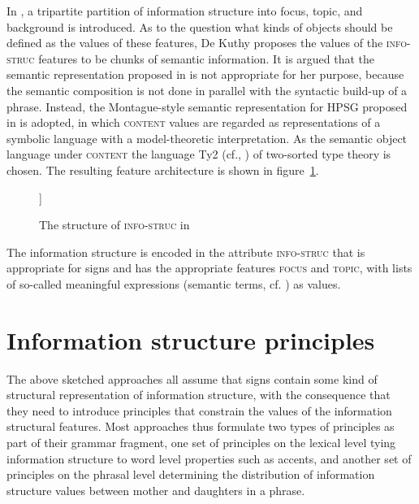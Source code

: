 \documentclass[output=paper]{langsci/langscibook}
\begin{document}
In \cite{deKuthy2002a}, a tripartite partition of information
structure into focus, topic, and background is introduced. As to the
question what kinds of objects should be defined as the values of
these features, De Kuthy proposes the values of the
\textsc{info-struc} features to be chunks of semantic information.  It
is argued that the semantic representation proposed in \cite{ps2} is
not appropriate for her purpose, because the semantic composition is
not done in parallel with the syntactic build-up of a phrase. Instead,
the Montague-style semantic representation for HPSG proposed in
\cite{Sailer2000a} is adopted, in which \textsc{content} values are
regarded as representations of a symbolic language with a
model-theoretic interpretation. As the semantic object language under
\textsc{content} the language Ty2 (cf., \cite{Gallin75a-u}) of
two-sorted type theory is chosen. The resulting feature architecture
is shown in figure~\ref{fig:info-struc}.

\begin{figure}[htb!]
  \begin{center}
\leavevmode
    \begin{avm}
     [\tp{sign}\\
      phon & list\\
      synsem & synsem\\
      info-struc &
      [\tp{info-struc}\\
        focus & list-of-mes\\
        topic & list-of-mes
      ] 
     ]
    \end{avm}
    \caption{The structure of \textsc{info-struc} in \cite{deKuthy2002a}}
    \label{fig:info-struc}
  \end{center}
\end{figure}
The information structure is
encoded in the attribute \textsc{info-struc} that is appropriate for
signs and has the appropriate features \textsc{focus} and
\textsc{topic}, with lists of so-called meaningful expressions
(semantic terms, cf.  \cite{Sailer2000a}) as values.

\section{Information structure principles}
\label{sec:inf-principles}

The above sketched approaches all assume that signs contain some kind
of structural representation of information structure, with the
consequence that they need to introduce principles that constrain the
values of the information structural features. Most approaches thus
formulate two types of principles as part of their grammar fragment,
one set of principles on the lexical level tying information structure to word
level properties such as accents, and another set of principles on the
phrasal level determining the distribution of information structure
values between mother and daughters in a phrase.
\end{document}
